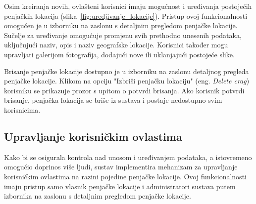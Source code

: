 Osim kreiranja novih, ovlašteni korisnici imaju mogućnost i uređivanja postojećih penjačkih lokacija (slika~\ref{fig:uredjivanje_lokacije}). Pristup ovoj funkcionalnosti omogućen je u izborniku na zaslonu s detaljnim pregledom penjačke lokacije. 
Sučelje za uređivanje omogućuje promjenu svih prethodno unesenih podataka, uključujući naziv, opis i naziv geografske lokacije. Korisnici također mogu upravljati galerijom fotografija, dodajući nove ili uklanjajući postojeće slike. 

Brisanje penjačke lokacije dostupno je u izborniku na zaslonu detaljnog pregleda penjačke lokacije. Klikom na opciju "Izbriši penjačku lokaciju" (eng. \textit{Delete crag}) korisniku se prikazuje prozor s upitom o potvrdi brisanja. Ako korisnik potvrdi brisanje, penjačka lokacija se briše iz sustava i postaje nedostupno svim korisnicima.

\subsection{Upravljanje korisničkim ovlastima}

Kako bi se osigurala kontrola nad unosom i uređivanjem podataka, a istovremeno omogućio doprinos više ljudi, sustav implementira mehanizam za upravljanje korisničkim ovlastima na razini pojedine penjačke lokacije. Ovoj funkcionalnosti imaju pristup samo vlasnik penjačke lokacije i administratori sustava putem izbornika na zaslonu s detaljnim pregledom penjačke lokacije. 

